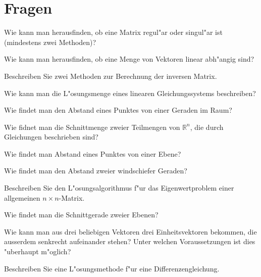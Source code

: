 \documentclass[a4paper,12pt,twocolumn]{article}
\begin{document}
\section{Fragen}
\begin{compactenum}
\item Wie kann man herausfinden, ob eine Matrix regul"ar oder singul"ar ist (mindestens zwei Methoden)?
\item Wie kann man herausfinden, ob eine Menge von Vektoren linear
abh"angig sind?
\item Beschreiben Sie zwei Methoden zur Berechnung der inversen Matrix.
\item Wie kann man die L"osungsmenge eines linearen Gleichungssystems
beschreiben?
\item Wie findet man den Abstand eines Punktes von einer Geraden im Raum?
\item Wie fidnet man die Schnittmenge zweier Teilmengen von $\mathbb R^n$, die
durch Gleichungen beschrieben sind?
\item Wie findet man Abstand eines Punktes von einer Ebene?
\item Wie findet man den Abstand zweier windschiefer Geraden?
\item Beschreiben Sie den L"osungsalgorithmus f"ur das Eigenwertproblem
einer allgemeinen $n\times n$-Matrix.
\item Wie findet man die Schnittgerade zweier Ebenen?
\item Wie kann man aus drei beliebigen Vektoren drei Einheitsvektoren
bekommen, die ausserdem senkrecht aufeinander stehen?
Unter welchen Voraussetzungen ist dies "uberhaupt m"oglich?
\item Beschreiben Sie eine L"osungsmethode f"ur eine Differenzengleichung.
\end{compactenum}
\end{document}

